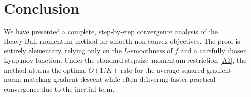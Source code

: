 \documentclass{article}
\begin{document}
\section*{Conclusion}
We have presented a complete, step‑by‑step convergence analysis of the Heavy‑Ball momentum method for smooth non‑convex objectives.  The proof is entirely elementary, relying only on the $L$‑smoothness of $f$ and a carefully chosen Lyapunov function.  Under the standard stepsize–momentum restriction \eqref{A3}, the method attains the optimal $O(1/K)$ rate for the average squared gradient norm, matching gradient descent while often delivering faster practical convergence due to the inertial term.
\end{document}
